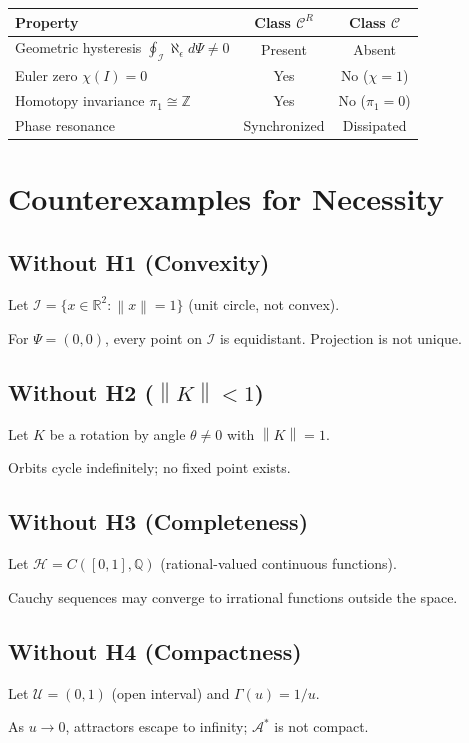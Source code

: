 \documentclass[11pt,a4paper]{article}
\theoremstyle{plain}
\theoremstyle{definition}
\newcommand{\Hilb}{\mathcal{H}}
\newcommand{\I}{\mathcal{I}}
\newcommand{\U}{\mathcal{U}}
\newcommand{\A}{\mathcal{A}}
\newcommand{\norm}[1]{\left\lVert #1 \right\rVert}
\begin{document}
\begin{center}
\begin{tabular}{|l|c|c|}
\hline
\textbf{Property} & \textbf{Class $\mathscr{C}^R$} & \textbf{Class $\mathscr{C}$} \\
\hline
Geometric hysteresis $\oint_{\I} \aleph_\epsilon d\Psi \neq 0$ & Present & Absent \\
Euler zero $\chi(I) = 0$ & Yes & No ($\chi = 1$) \\
Homotopy invariance $\pi_1 \cong \mathbb{Z}$ & Yes & No ($\pi_1 = 0$) \\
Phase resonance & Synchronized & Dissipated \\
\hline
\end{tabular}
\end{center}

\appendix
\section{Counterexamples for Necessity}

\subsection{Without H1 (Convexity)}

Let $\I = \{x \in \mathbb{R}^2 : \norm{x} = 1\}$ (unit circle, not convex).

For $\Psi = (0, 0)$, every point on $\I$ is equidistant. Projection is not unique.

\subsection{Without H2 ($\norm{K} < 1$)}

Let $K$ be a rotation by angle $\theta \neq 0$ with $\norm{K} = 1$.

Orbits cycle indefinitely; no fixed point exists.

\subsection{Without H3 (Completeness)}

Let $\Hilb = C([0,1], \mathbb{Q})$ (rational-valued continuous functions).

Cauchy sequences may converge to irrational functions outside the space.

\subsection{Without H4 (Compactness)}

Let $\U = (0, 1)$ (open interval) and $\Gamma(u) = 1/u$.

As $u \to 0$, attractors escape to infinity; $\A^*$ is not compact.

\nocite{banach,kreyszig,rudin,brezis}
\printbibliography
\end{document}
